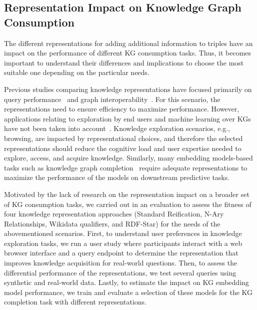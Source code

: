 \subsection{Representation Impact on Knowledge Graph Consumption}


The different representations for adding additional information to triples have an impact on the performance of different KG consumption tasks. Thus, it becomes important to understand their differences and implications to choose the most suitable one depending on the particular needs. 

Previous studies comparing knowledge representations have focused primarily on query performance~\parencite{das2014tale,nguyen2014don,alocci2015property,hernandez2015reifying,frey2019evaluation,orlandi2021benchmarking} and graph interoperability~\parencite{angles2019rdf,angles2020mapping}. For this scenario, the representations need to ensure efficiency to maximize performance. 
However, applications relating to exploration by end users and machine learning over KGs have not been taken into account~\parencite{karger2014semantic,hogan2020twodecades}. 
Knowledge exploration scenarios, e.g., browsing, are impacted by representational choices, and therefore the selected representations should reduce the cognitive load and user expertise needed to explore, access, and acquire knowledge.
Similarly, many embedding models-based tasks such as knowledge graph completion~\parencite{ren2022smore} require adequate representations to maximize the performance of the models on downstream predictive tasks.

Motivated by the lack of research on the representation impact on a broader set of KG consumption tasks, we carried out in \parencite{iglesias2023kgconsumption} an evaluation to assess the fitness of four knowledge representation approaches (Standard Reification, N-Ary Relationships, Wikidata qualifiers, and RDF-Star) for the needs of the abovementioned scenarios. 
First, to understand user preferences in knowledge exploration tasks, we run a user study where participants interact with a web browser interface and a query endpoint to determine the representation that improves knowledge acquisition for real-world questions.
Then, to assess the differential performance of the representations, we test several queries using synthetic and real-world data.
Lastly, to estimate the impact on KG embedding model performance, we train and evaluate a selection of these models for the KG completion task with different representations.


